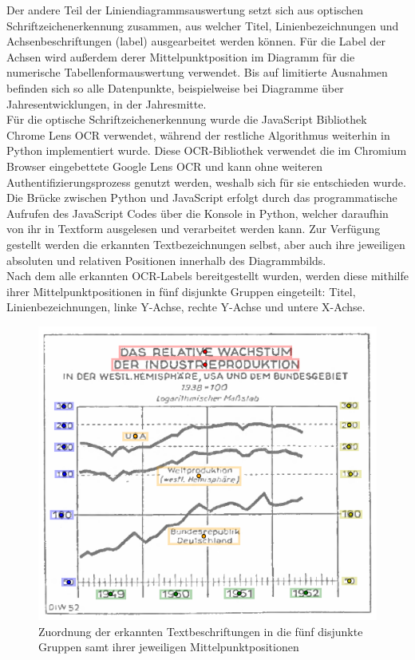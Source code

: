 Der andere Teil der Liniendiagrammsauswertung setzt sich aus optischen Schriftzeichenerkennung zusammen, aus welcher Titel, Linienbezeichnungen und Achsenbeschriftungen (label) ausgearbeitet werden können. Für die Label der Achsen wird außerdem derer Mittelpunktposition im Diagramm für die numerische Tabellenformauswertung verwendet. Bis auf limitierte Ausnahmen befinden sich so alle Datenpunkte, beispielweise bei Diagramme über Jahresentwicklungen, in der Jahresmitte.
\\
Für die optische Schriftzeichenerkennung wurde die JavaScript Bibliothek Chrome Lens OCR \cite{dimden2024chromelensocr} verwendet, während der restliche Algorithmus weiterhin in Python implementiert wurde. Diese OCR-Bibliothek verwendet die im Chromium Browser eingebettete Google Lens OCR und kann ohne weiteren Authentifizierungsprozess genutzt werden, weshalb sich für sie entschieden wurde. Die Brücke zwischen Python und JavaScript erfolgt durch das programmatische Aufrufen des JavaScript Codes über die Konsole in Python, welcher daraufhin von ihr in Textform ausgelesen und verarbeitet werden kann. Zur Verfügung gestellt werden die erkannten Textbezeichnungen selbst, aber auch ihre jeweiligen absoluten und relativen Positionen innerhalb des Diagrammbilds.
\\
Nach dem alle erkannten OCR-Labels bereitgestellt wurden, werden diese mithilfe ihrer Mittelpunktpositionen in fünf disjunkte Gruppen eingeteilt: Titel, Linienbezeichnungen, linke Y-Achse, rechte Y-Achse und untere X-Achse.

\begin{figure}[h!]
    \centering
    \captionsetup{width=.75\linewidth}
    \includegraphics[width=.75\textwidth]{Implementation/img/ocr.png}
    \caption{ Zuordnung der erkannten Textbeschriftungen in die fünf disjunkte Gruppen samt ihrer jeweiligen Mittelpunktpositionen}
    \label{fig:ocr}
\end{figure}

